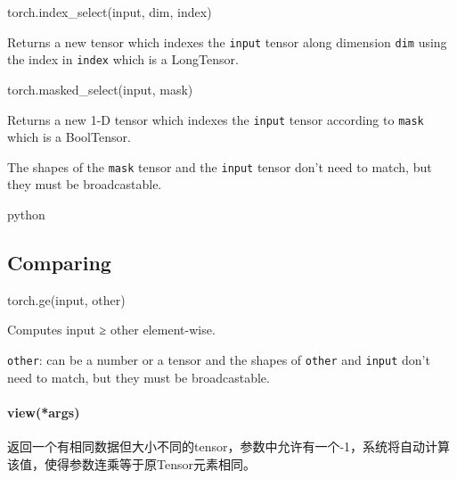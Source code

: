 \documentclass[
]{article}
\newenvironment{Shaded}{}{}
\newcommand{\BuiltInTok}[1]{#1}
\newcommand{\NormalTok}[1]{#1}
\begin{document}
\begin{Shaded}
\begin{Highlighting}[]
\NormalTok{torch.index\_select(}\BuiltInTok{input}\NormalTok{, dim, index)}
\end{Highlighting}
\end{Shaded}

Returns a new tensor which indexes the \texttt{input} tensor along
dimension \texttt{dim} using the index in \texttt{index} which is a
LongTensor.

\begin{Shaded}
\begin{Highlighting}[]
\NormalTok{torch.masked\_select(}\BuiltInTok{input}\NormalTok{, mask)}
\end{Highlighting}
\end{Shaded}

Returns a new 1-D tensor which indexes the \texttt{input} tensor
according to \texttt{mask} which is a BoolTensor.

The shapes of the \texttt{mask} tensor and the \texttt{input} tensor
don't need to match, but they must be broadcastable.

\begin{Shaded}
\begin{Highlighting}[]
\NormalTok{\textasciigrave{}\textasciigrave{}\textasciigrave{}python
}


\NormalTok{\textasciigrave{}\textasciigrave{}\textasciigrave{}}
\end{Highlighting}
\end{Shaded}

\hypertarget{header-n1209}{%
\subsection{Comparing}\label{header-n1209}}

\begin{Shaded}
\begin{Highlighting}[]
\NormalTok{torch.ge(}\BuiltInTok{input}\NormalTok{, other)}
\end{Highlighting}
\end{Shaded}

Computes input ≥ other element-wise.

\texttt{other}: can be a number or a tensor and the shapes of
\texttt{other} and \texttt{input} don't need to match, but they must be
broadcastable.

\hypertarget{header-n1022}{%
\paragraph{view(*args)}\label{header-n1022}}

返回一个有相同数据但大小不同的tensor，参数中允许有一个-1，系统将自动计算该值，使得参数连乘等于原Tensor元素相同。
\end{document}
